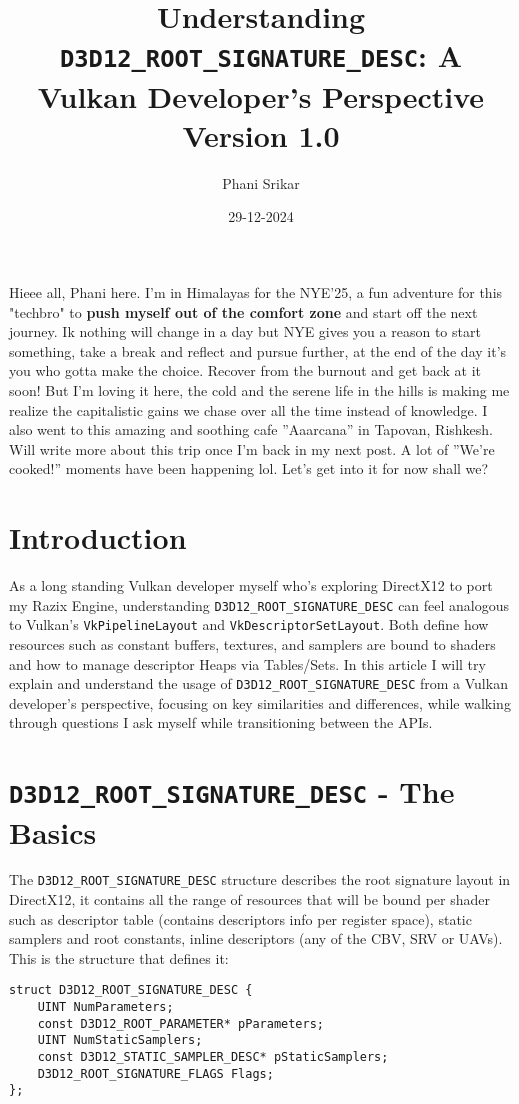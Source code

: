 \documentclass{article}
\title{Understanding \texttt{D3D12\_ROOT\_SIGNATURE\_DESC}: A Vulkan Developer's Perspective \\
\small Version 1.0
}
\author{Phani Srikar}
\date{29-12-2024}
\begin{document}
\maketitle

Hieee all, Phani here. I'm in Himalayas for the NYE'25, a fun adventure for this "techbro" to \textbf{push myself out of the comfort zone} and start off the next journey. Ik nothing will change in a day but NYE gives you a reason to start something, take a break and reflect and pursue further, at the end of the day it's you who gotta make the choice. Recover from the burnout and get back at it soon! But I'm loving it here, the cold and the serene life in the hills is making me realize the capitalistic gains we chase over all the time instead of knowledge. I also went to this amazing and soothing cafe ”Aaarcana” in Tapovan, Rishkesh. Will write more about this trip once I’m back in my next post.  A lot of ”We’re cooked!” moments have been happening lol. Let’s get into it for now shall we?

\section*{Introduction}
As a long standing Vulkan developer myself who's exploring DirectX12 to port my Razix Engine, understanding \lstinline{D3D12_ROOT_SIGNATURE_DESC} can feel analogous to Vulkan's \lstinline{VkPipelineLayout} and \lstinline{VkDescriptorSetLayout}. Both define how resources such as constant buffers, textures, and samplers are bound to shaders and how to manage descriptor Heaps via Tables/Sets. In this article I will try explain and understand the usage of \lstinline{D3D12_ROOT_SIGNATURE_DESC} from a Vulkan developer's perspective, focusing on key similarities and differences, while walking through questions I ask myself while transitioning between the APIs.

\section*{\texttt{D3D12\_ROOT\_SIGNATURE\_DESC} - The Basics}
The \lstinline{D3D12_ROOT_SIGNATURE_DESC} structure describes the root signature layout in DirectX12, it contains all the range of resources that will be bound per shader such as descriptor table (contains descriptors info per register space), static samplers and root constants, inline descriptors (any of the CBV, SRV or UAVs). This is the structure that defines it:

\begin{verbatim}
struct D3D12_ROOT_SIGNATURE_DESC {
    UINT NumParameters;
    const D3D12_ROOT_PARAMETER* pParameters;
    UINT NumStaticSamplers;
    const D3D12_STATIC_SAMPLER_DESC* pStaticSamplers;
    D3D12_ROOT_SIGNATURE_FLAGS Flags;
};
\end{verbatim}
\end{document}
